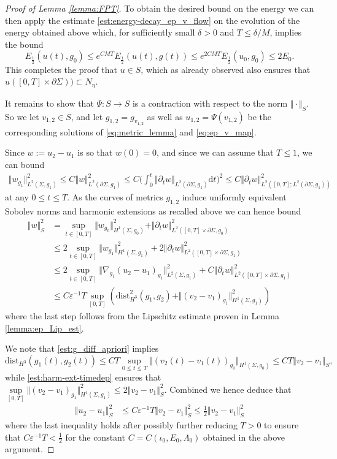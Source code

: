 \documentclass[10pt,reqno]{amsart}
\theoremstyle{plain}
\theoremstyle{definition}
\numberwithin{equation}{section}
\newcommand{\La}{\Lambda}
\newcommand{\Si}{\Sigma}
\newcommand{\ep}{\varepsilon}
\newcommand{\norm}[1]{\Vert#1\Vert}
\newcommand{\beqs}{\begin{equation*}}
\newcommand{\eeqs}{\end{equation*}}
\newcommand{\beqas}{\begin{equation*}\begin{aligned}}
\newcommand{\eeqas}{\end{aligned}\end{equation*}}
\newcommand{\half}{\frac{1}{2}}
\newcommand{\dd}{\mathrm{d}} %
\newcommand{\eps}{\varepsilon}
\newcommand{\na}{\nabla}
\newcommand{\dist}{\text{dist}}
\newcommand{\pSi}{{\partial \Sigma}}
\newcommand{\hf}{\frac{1}{2}} %
\newcommand{\p}{\partial} %
\begin{document}
\begin{proof}[Proof of Lemma \ref{lemma:FPT}]
    To obtain the desired bound on the energy we can then apply the estimate \eqref{est:energy-decay_ep_v_flow} on the evolution of the energy obtained above which, for sufficiently small $\delta>0$ and $T\le\delta/M$, implies the bound
    \beqs
        E_{\hf}(u(t),g_0)\leq e^{CMT} E_{\hf}(u(t),g(t))\le e^{2CMT}E_{\hf}(u_0,g_0)\le 2E_0.
    \eeqs
    This completes the proof that $u\in S$, which as already observed also ensures that $u([0,T]\times \pSi))\subset N_\eta$.
    
    It remains to show that $\Psi\colon S\to S$ is a contraction with respect to the norm $\norm{\cdot}_{S}$. So we let $v_{1,2}\in S$, and let $g_{1,2}=g_{v_{1,2}}$ as well as $u_{1,2}=\Psi(v_{1,2})$ be the corresponding solutions of \eqref{eq:metric_lemma} and \eqref{eq:ep_v_map}.
    
    Since $w:=u_2-u_1$ is so that $w(0)=0$, and since we can assume that $T\leq 1$, we can bound 
    \begin{align*}
        \norm{w_{g_1}}^2_{L^2(\Si,g_1)}\le C\norm{w}^2_{L^2(\p\Si,g_1)} \le C\bigg(\int_0^t\norm{\p_tw}_{L^2(\p\Si,g_1)}\dd t\bigg)^2 \le C\norm{\p_tw}_{L^2([0,T];L^2(\p\Si,g_1))}^2
    \end{align*}
    at any $0\le t\le T$. As the curves of metrics $g_{1,2}$ induce uniformly equivalent Sobolev norms and harmonic extensions as recalled above we can hence bound 
    \beqas
        \norm{w}^2_S&=\sup\limits_{t \in [0,T]}\norm{w_{g_0}}^2_{H^1(\Si,g_0)} + \norm{\p_t w}^2_{L^2([0,T]\times\p\Si,g_0)}\\
        &\le 2\sup\limits_{t \in [0,T]}\norm{w_{g_1}}^2_{H^1(\Si,g_1)} + 2\norm{\p_t w}^2_{L^2([0,T]\times\p\Si,g_1)}\\
        &\leq 2 \sup\limits_{t \in [0,T]}\norm{\na_{g_1}(u_2-u_1)_{g_1}}^2_{L^2(\Si,g_1)} +C \norm{\p_t w}^2_{L^2([0,T]\times\p\Si,g_1)}\\
        &\leq C\ep^{-1}T\sup\limits_{[0,T]} \left( \dist ^2_{H^{3}}(g_1,g_2)+\norm{(v_2-v_1)_{{g_1}}}^2_{H^1(\Si,g_1)}\right)
    \eeqas
    where the last step follows from the Lipschitz estimate proven in Lemma \ref{lemma:ep_Lip_est}.

    We note that  \eqref{est:g_diff_apriori} implies 
    \begin{equation}\label{est:contraction_term_2}
        \dist_{H^3}(g_1(t),g_2(t)) \leq CT \sup\limits_{0 \leq t \leq T} \norm{(v_2(t)-v_1(t))_{g_0}}_{H^1(\Si,g_0)} \leq CT \norm{v_2-v_1}_{S},
    \end{equation}
    while \eqref{est:harm-ext-timedep} ensures that $\sup\limits_{[0,T]}\norm{(v_2-v_1)_{{g_1}}}^2_{H^1(\Si,g_1)} \leq 2\norm{v_2-v_1}_{S}^2$. Combined we hence deduce that 
    \beqas
        \norm{u_2-u_1}^2_S & \leq C\eps^{-1} T \norm{v_2-v_1}_S^2\leq \half \norm{v_2-v_1}_S^2
    \eeqas
    where the last inequality holds after possibly further reducing $T>0$ to ensure that $C\eps^{-1}T<\half$ for the constant $C=C(\iota_0, E_0, \La_0)$ obtained in the above argument. 
\end{proof}
\end{document}
